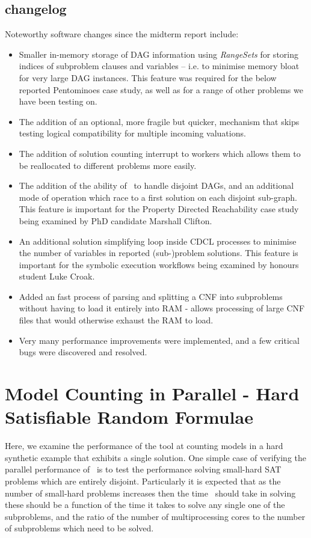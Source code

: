 \documentclass[
10pt, %
a4paper, %
oneside, %
headinclude,footinclude, %
BCOR5mm, %
]{scrartcl}
\begin{document}
\subsection{changelog}
Noteworthy software changes since the midterm report include:
\begin{itemize}
\item	Smaller in-memory storage of DAG information using {\em RangeSets} for storing indices of subproblem clauses and variables -- i.e. to minimise memory bloat for very large DAG instances. This feature was required for the below reported Pentominoes case study, as well as for a range of other problems we have been testing on. 
\item	The addition of an optional, more fragile but quicker, mechanism that skips testing logical compatibility for multiple incoming valuations. %
\item	The addition of solution counting interrupt to workers which allows them to be reallocated to different problems more easily.
\item	The addition of the ability of \dagster\ to handle disjoint DAGs, and an additional mode of operation which race to a first solution on each disjoint sub-graph. This feature is important for the Property Directed Reachability case study being examined by PhD candidate Marshall Clifton. 
\item	An additional solution simplifying loop inside CDCL processes to minimise the number of variables in reported (sub-)problem solutions. This feature is important for the symbolic execution workflows being examined by honours student Luke Croak. 
\item	Added an fast process of parsing and splitting a CNF into subproblems without having to load it entirely into RAM - allows processing of large CNF files that would otherwise exhaust the RAM to load.
\item	Very many performance improvements were implemented, and a few critical bugs were discovered and resolved.
\end{itemize}


\clearpage
\section{Model Counting in Parallel - Hard Satisfiable Random Formulae}\label{section:section1}

Here, we examine the performance of the tool at counting models in a hard synthetic example that exhibits a single solution.
One simple case of verifying the parallel performance of \dagster\ is to test the performance solving small-hard SAT problems which are entirely disjoint.
Particularly it is expected that as the number of small-hard problems increases then the time \dagster\ should take in solving these should be a function of the time it takes to solve any single one of the subproblems, and the ratio of the number of multiprocessing cores to the number of subproblems which need to be solved.
\end{document}
